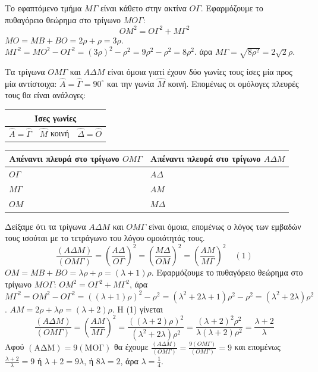 \begin{alist}
    \item
    Το εφαπτόμενο τμήμα $M\Gamma$ είναι κάθετο στην ακτίνα $O\Gamma$.
    Εφαρμόζουμε το πυθαγόρειο θεώρημα στο τρίγωνο $MO\Gamma$:
    \[ OM^2 = O\Gamma^2 + M\Gamma^2 \]
    $MO = MB + BO = 2\rho + \rho = 3\rho$.
    $M\Gamma^2 = MO^2 - O\Gamma^2 = (3\rho)^2 - \rho^2 = 9\rho^2 - \rho^2 = 8\rho^2$.
    άρα $M\Gamma = \sqrt{8\rho^2} = 2\sqrt{2}\rho$.

    \item
    \begin{rlist}
        \item Τα τρίγωνα $OM\Gamma$ και $A\Delta M$ είναι όμοια γιατί έχουν δύο γωνίες τους ίσες μία προς μία αντίστοιχα: $ \hat{A} = \hat{\Gamma} = 90^\circ $ και την γωνία $ \hat{M} $ κοινή. Επομένως οι ομόλογες πλευρές τους θα είναι ανάλογες:
        \begin{tabular}{|c|c|c|}
        \hline
        \multicolumn{3}{|c|}{Ίσες γωνίες} \\
        \hline
        $ \hat{A} = \hat{\Gamma} $ & $ \hat{M} $ κοινή & $ \hat{\Delta} = \hat{O} $ \\
        \hline
        \end{tabular}

        \begin{tabular}{|l|l|}
        \hline
        Απέναντι πλευρά στο τρίγωνο $OM\Gamma$ & Απέναντι πλευρά στο τρίγωνο $A\Delta M$ \\
        \hline
        $O\Gamma$ & $A\Delta$ \\
        $M\Gamma$ & $AM$ \\
        $OM$ & $M\Delta$ \\
        \hline
        \end{tabular}
        \item Δείξαμε ότι τα τρίγωνα $A\Delta M$ και $OM\Gamma$ είναι όμοια, επομένως ο λόγος των εμβαδών τους ισούται με το τετράγωνο του λόγου ομοιότητάς τους.
        \[ \frac{(A\Delta M)}{(OM\Gamma)} = \left(\frac{A\Delta}{O\Gamma}\right)^2 = \left(\frac{M\Delta}{OM}\right)^2 = \left(\frac{AM}{M\Gamma}\right)^2 \quad (1) \]
        $OM = MB + BO = \lambda\rho + \rho = (\lambda+1)\rho$.
        Εφαρμόζουμε το πυθαγόρειο θεώρημα στο τρίγωνο $M O \Gamma$:
        $OM^2 = O\Gamma^2 + M\Gamma^2$, άρα
        $M\Gamma^2 = OM^2 - O\Gamma^2 = ((\lambda+1)\rho)^2 - \rho^2 = (\lambda^2+2\lambda+1)\rho^2 - \rho^2 = (\lambda^2+2\lambda)\rho^2$.
        $AM = 2\rho + \lambda\rho = (\lambda+2)\rho$.
        Η (1) γίνεται
        \[ \frac{(A\Delta M)}{(OM\Gamma)} = \left(\frac{AM}{M\Gamma}\right)^2 = \frac{((\lambda+2)\rho)^2}{(\lambda^2+2\lambda)\rho^2} = \frac{(\lambda+2)^2\rho^2}{\lambda(\lambda+2)\rho^2} = \frac{\lambda+2}{\lambda} \]
        Αφού $(\text{ΑΔΜ}) = 9(\text{ΜΟΓ})$ θα έχουμε $\frac{(A\Delta M)}{(OM\Gamma)} = \frac{9(OM\Gamma)}{(OM\Gamma)} = 9$ και επομένως $\frac{\lambda+2}{\lambda} = 9$ ή
        $\lambda+2 = 9\lambda$, ή $8\lambda=2$, άρα $\lambda = \frac{1}{4}$.
    \end{rlist}
\end{alist}